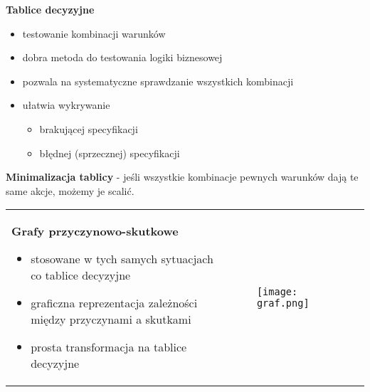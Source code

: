 \documentclass[../main.tex]{subfiles}
\begin{document}
    \textbf{Tablice decyzyjne}
    \begin{itemize}
        \item testowanie kombinacji warunków
        \item dobra metoda do testowania logiki biznesowej
        \item pozwala na systematyczne sprawdzanie wszystkich kombinacji
        \item ułatwia wykrywanie
        \begin{itemize}
            \item brakującej specyfikacji
            \item błędnej (sprzecznej) specyfikacji
        \end{itemize}
    \end{itemize}
    \textbf{Minimalizacja tablicy} - jeśli wszystkie kombinacje pewnych warunków dają te same akcje, możemy je scalić.

    \begin{table}[H]
        \begin{center}
            \begin{tabular}{p{8cm} p{8cm}}
                \textbf{Grafy przyczynowo-skutkowe}
                \begin{itemize}
                    \item stosowane w tych samych sytuacjach co tablice decyzyjne
                    \item graficzna reprezentacja zależności między przyczynami a skutkami
                    \item prosta transformacja na tablice decyzyjne
                \end{itemize}
                &
                \begin{figure}[H]
                    \texttt{[image: graf.png]}
                \end{figure}\\
            \end{tabular}
        \end{center}
    \end{table}
\end{document}
